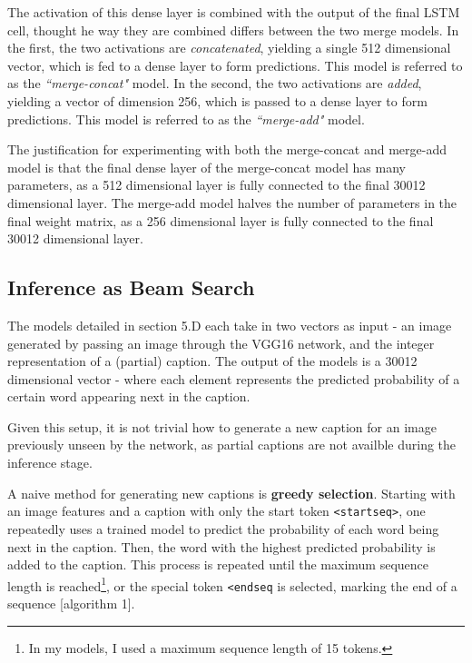 \documentclass[letterpaper, 10 pt, conference]{ieeeconf}
\begin{document}
The activation of this dense layer is combined with the output of the final LSTM cell, thought he way they are combined differs between the two merge models. In the first, the two activations are \textit{concatenated}, yielding a single 512 dimensional vector, which is fed to a dense layer to form predictions. This model is referred to as the \textit{``merge-concat"} model. In the second, the two activations are \textit{added}, yielding a vector of dimension 256, which is passed to a dense layer to form predictions. This model is referred to as the \textit{``merge-add"} model.

The justification for experimenting with both the merge-concat and merge-add model is that the final dense layer of the merge-concat model has many parameters, as a 512 dimensional layer is fully connected to the final 30012 dimensional layer. The merge-add model halves the number of parameters in the final weight matrix, as a 256 dimensional layer is fully connected to the final 30012 dimensional layer.


\subsection{Inference as Beam Search}

The models detailed in section 5.D each take in two vectors as input - an image generated by passing an image through the VGG16 network, and the integer representation of a (partial) caption. The output of the models is a 30012 dimensional vector - where each element represents the predicted probability of a certain word appearing next in the caption. 

Given this setup, it is not trivial how to generate a new caption for an image previously unseen by the network, as partial captions are not availble during the inference stage. 

A naive method for generating new captions is \textbf{greedy selection}. Starting with an image features and a caption with only the start token \texttt{<startseq>}, one repeatedly uses a trained model to predict the probability of each word being next in the caption. Then, the word with the highest predicted probability is added to the caption. This process is repeated until the maximum sequence length is reached\footnote{In my models, I used a maximum sequence length of 15 tokens.}, or the special token \texttt{<endseq} is selected, marking the end of a sequence [algorithm 1].
\end{document}
